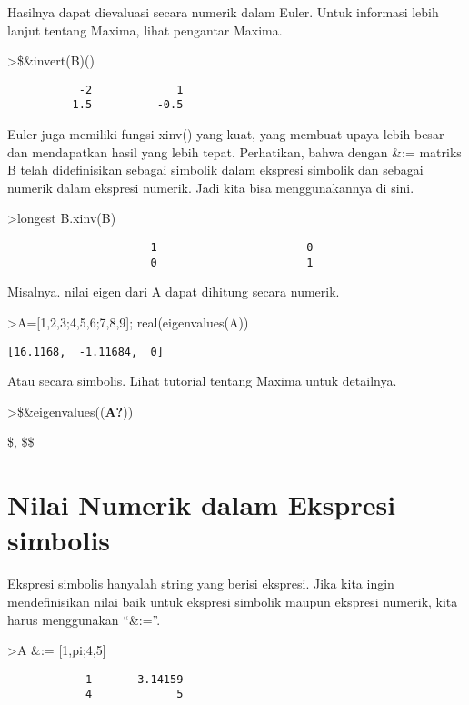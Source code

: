 \documentclass[
]{book}
\begin{document}
Hasilnya dapat dievaluasi secara numerik dalam Euler. Untuk informasi lebih lanjut tentang Maxima, lihat pengantar Maxima.

\textgreater\$\&invert(B)()

\begin{verbatim}
           -2             1 
          1.5          -0.5 
\end{verbatim}

Euler juga memiliki fungsi xinv() yang kuat, yang membuat upaya lebih besar dan mendapatkan hasil yang lebih tepat. Perhatikan, bahwa dengan \&:= matriks B telah didefinisikan sebagai simbolik dalam ekspresi simbolik dan sebagai numerik dalam ekspresi numerik. Jadi kita bisa menggunakannya di sini.

\textgreater longest B.xinv(B)

\begin{verbatim}
                      1                       0 
                      0                       1 
\end{verbatim}

Misalnya. nilai eigen dari A dapat dihitung secara numerik.

\textgreater A={[}1,2,3;4,5,6;7,8,9{]}; real(eigenvalues(A))

\begin{verbatim}
[16.1168,  -1.11684,  0]
\end{verbatim}

Atau secara simbolis. Lihat tutorial tentang Maxima untuk detailnya.

\textgreater\$\&eigenvalues((\textbf{A?}))

\$\left[ \left[ \frac{15-3\,\sqrt{33}}{2} , \frac{3\,\sqrt{33}+15}{2}   , 0 \right]  , \left[ 1 , 1 , 1 \right]  \right{]} \$\$

\chapter{Nilai Numerik dalam Ekspresi simbolis}\label{nilai-numerik-dalam-ekspresi-simbolis}

Ekspresi simbolis hanyalah string yang berisi ekspresi. Jika kita ingin mendefinisikan nilai baik untuk ekspresi simbolik maupun ekspresi numerik, kita harus menggunakan ``\&:=''.

\textgreater A \&:= {[}1,pi;4,5{]}

\begin{verbatim}
            1       3.14159 
            4             5 
\end{verbatim}
\end{document}
